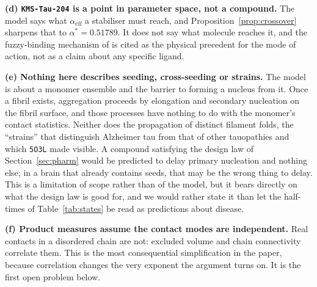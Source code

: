 \documentclass[11pt,reqno]{amsart}
\theoremstyle{plain}
\theoremstyle{definition}
\theoremstyle{remark}
\numberwithin{equation}{section}
\newcommand{\aeff}{\alpha_{\mathrm{eff}}}
\newcommand{\lead}{\texttt{KMS-Tau-204}}
\begin{document}
\textbf{(d) \lead{} is a point in parameter space, not a compound.} The model says what $\aeff$ a stabiliser must reach, and Proposition~\ref{prop:crossover} sharpens that to $\alpha^\ast=0.51789$. It does not say what molecule reaches it, and the fuzzy-binding mechanism of \cite{Heller2020} is cited as the physical precedent for the mode of action, not as a claim about any specific ligand.

\textbf{(e) Nothing here describes seeding, cross-seeding or strains.} The model is about a monomer ensemble and the barrier to forming a nucleus from it. Once a fibril exists, aggregation proceeds by elongation and secondary nucleation on the fibril surface, and those processes have nothing to do with the monomer's contact statistics. Neither does the propagation of distinct filament folds, the ``strains'' that distinguish Alzheimer tau from that of other tauopathies and which \texttt{5O3L} made visible. A compound satisfying the design law of Section~\ref{sec:pharm} would be predicted to delay primary nucleation and nothing else; in a brain that already contains seeds, that may be the wrong thing to delay. This is a limitation of scope rather than of the model, but it bears directly on what the design law is good for, and we would rather state it than let the half-times of Table~\ref{tab:states} be read as predictions about disease.

\textbf{(f) Product measures assume the contact modes are independent.} Real contacts in a disordered chain are not: excluded volume and chain connectivity correlate them. This is the most consequential simplification in the paper, because correlation changes the very exponent the argument turns on. It is the first open problem below.
\end{document}
